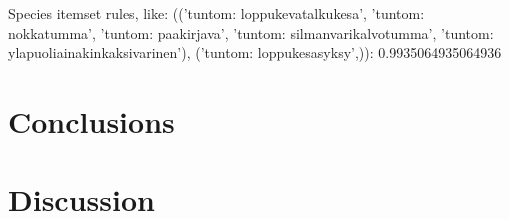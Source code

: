 \documentclass[english]{tktltiki2}
\begin{document}
Species itemset rules, like: {(('tuntom: loppukevatalkukesa', 'tuntom: nokkatumma', 'tuntom: paakirjava', 'tuntom: silmanvarikalvotumma', 'tuntom: ylapuoliainakinkaksivarinen'), ('tuntom: loppukesasyksy',)): 0.9935064935064936}


\section{Conclusions}



\section{Discussion}



\pagebreak

%
%
% 
%




\lastpage
\end{document}
